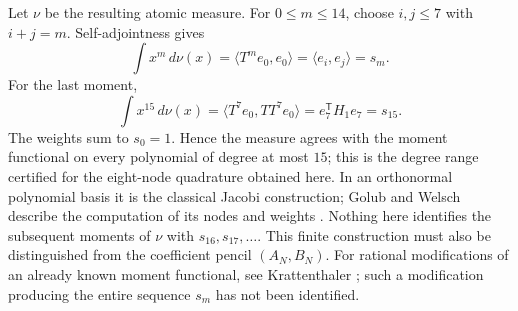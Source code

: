 \documentclass[11pt]{article}
\begin{document}
Let $\nu$ be the resulting atomic measure. For $0\le m\le14$, choose
$i,j\le7$ with $i+j=m$. Self-adjointness gives
\[
 \int x^m\,d\nu(x)=\langle T^m e_0,e_0\rangle
 =\langle e_i,e_j\rangle=s_m.
\]
For the last moment,
\[
 \int x^{15}\,d\nu(x)=\langle T^7e_0,T T^7e_0\rangle
 =e_7^{\mathsf T}H_1e_7=s_{15}.
\]
The weights sum to $s_0=1$. Hence the measure agrees with the moment
functional on every polynomial of degree at most $15$; this is the
degree range certified for the eight-node quadrature obtained here.
In an orthonormal polynomial basis it is the classical Jacobi construction;
Golub and Welsch describe the computation of its nodes and weights
\cite[Sec.~2, (2.6); Sec.~4]{golubwelsch1969}.
Nothing here identifies the subsequent moments of $\nu$ with
$s_{16},s_{17},\ldots$. This finite construction must also be distinguished
from the coefficient pencil $(A_N,B_N)$.
For rational modifications of an already known moment functional, see
Krattenthaler \cite[Thm.~1; Sec.~6]{krattenthaler2021}; such a modification
producing the entire sequence $s_m$ has not been identified.
\end{document}
